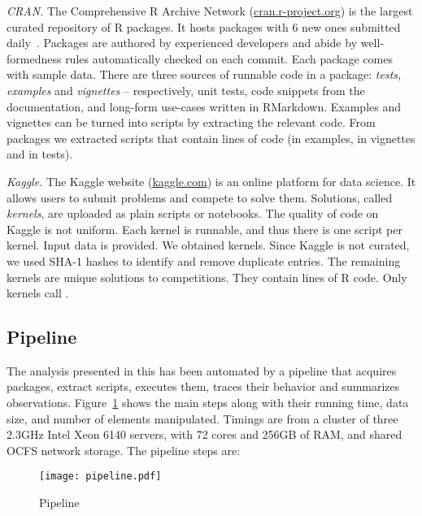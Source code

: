 \documentclass[review,screen,acmsmall,anonymous=true]{acmart}
\newcommand{\mypara}[1]{\medskip\noindent\emph{#1}\xspace}
\begin{document}
\mypara{CRAN.} The Comprehensive R Archive Network
({\small \url{cran.r-project.org}}) is the largest curated repository of R
packages. It hosts \CranAvailablePackagesRnd packages with 6 new ones submitted
daily~\cite{Ligges2017}. Packages are authored by experienced developers and
abide by well-formedness rules automatically checked on each commit.
Each package comes with sample data. There are three sources of
runnable code in a package: \emph{tests, examples} and \emph{vignettes} --
respectively, unit tests, code snippets from the documentation, and long-form
use-cases written in RMarkdown. Examples and vignettes can be turned into
scripts by extracting the relevant code. From \CranPackages packages we
extracted \CranRunnableScripts scripts that contain \CranRunnableCode lines of
code (\CranRunnableCodeExamplesRnd in examples, \CranRunnableCodeVignettesRnd in
vignettes and \CranRunnableCodeTestsRnd in tests).

\mypara{Kaggle.} The Kaggle website ({\small \url{kaggle.com}}) is an online
platform for data science. It allows users to submit problems and compete to
solve them. Solutions, called \emph{kernels}, are uploaded as plain scripts or
notebooks. The quality of code on Kaggle is not uniform. Each kernel is
runnable, and thus there is one script per kernel. Input data is provided. We
obtained \KaggleKernels kernels. Since Kaggle is not curated, we used SHA-1 hashes
to identify and remove \KaggleDuplicates duplicate entries. The remaining
\KaggleUnique kernels are unique solutions to \KaggleCompetitions competitions.
They contain \KaggleCode lines of R code. Only \KaggleWithEvals kernels call
\eval.

\subsection{Pipeline}

The analysis presented in this has been automated by a pipeline that acquires
packages, extract scripts, executes them, traces their behavior and summarizes
observations. Figure~\ref{fig:pipeline} shows the main steps along with their
running time, data size, and number of elements manipulated. Timings are from a
cluster of three 2.3GHz Intel Xeon 6140 servers, with 72 cores and 256GB of RAM,
and shared OCFS network storage. The pipeline steps are:


\begin{figure}[!h]\hspace{-5mm}
  \texttt{[image: pipeline.pdf]}
  \caption{Pipeline}\label{fig:pipeline}
\end{figure}
\end{document}
